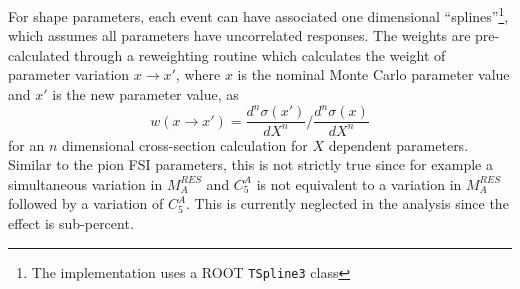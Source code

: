For shape parameters, each event can have associated one dimensional ``splines''\footnote{The implementation uses a ROOT \texttt{TSpline3} class}, which assumes all parameters have uncorrelated responses. The weights are pre-calculated through a reweighting routine which calculates the weight of parameter variation $x \rightarrow x'$, where $x$ is the nominal Monte Carlo parameter value and $x'$ is the new parameter value, as
\begin{equation}
	w(x\rightarrow x') = \frac{d^n\sigma(x')}{dX^n} / \frac{d^n\sigma(x)}{dX^n}
\end{equation}
for an $n$ dimensional cross-section calculation for $X$ dependent parameters. Similar to the pion FSI parameters, this is not strictly true since for example a simultaneous variation in $M_A^{RES}$ and $C_5^A$ is not equivalent to a variation in $M_A^{RES}$ followed by a variation of $C_5^A$. This is currently neglected in the analysis since the effect is sub-percent.

